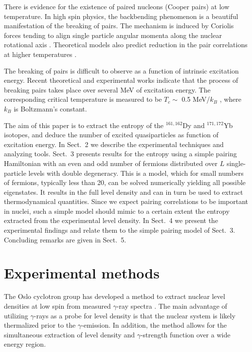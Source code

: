 There is evidence for the existence of paired nucleons (Cooper pairs) at low temperature. In high spin physics, the backbending phenomenon is a beautiful manifestation of the breaking of pairs. The mechanism is induced by Coriolis forces tending to align single particle angular momenta along the nuclear rotational axis \cite{3,4}. Theoretical models also predict reduction in the pair correlations at higher temperatures \cite{5,6,7}.

The breaking of pairs is difficult to observe as a function of intrinsic excitation energy. Recent theoretical \cite{7} and experimental \cite{8,9} works indicate that the process of breaking pairs takes place over several MeV of excitation energy. The corresponding critical temperature is measured to be $T_c \sim $ 0.5 MeV/$k_B$ \cite{10}, where $k_B$ is Boltzmann's constant.

The aim of this paper is to extract the entropy of the $^{161,162}$Dy and $^{171,172}$Yb isotopes, and deduce the number of excited quasiparticles as function of excitation energy. In Sect.~2 we describe the experimental techniques and analyzing tools. Sect.~3 presents results for the entropy using a simple pairing Hamiltonian with an even and odd number of fermions distributed over $L$ single-particle levels with double degeneracy. This is a model, which for small numbers of fermions, typically less than 20, can be solved numerically yielding all possible eigenstates. It results in the full level density and can in turn be used to extract thermodynamical quantities. Since we expect pairing correlations to be important in nuclei, such a simple model should mimic to a certain extent the entropy extracted from the experimental level density. In Sect.~4 we present the experimental findings and relate them to the simple pairing model of Sect.~3. Concluding remarks are given in Sect.~5.


\section{Experimental methods}

The Oslo cyclotron group has developed a method to extract nuclear level densities at low spin from measured $\gamma$-ray spectra \cite{8,9,10,11,17}. The main advantage of utilizing $\gamma$-rays as a probe for level density is that the nuclear system is likely thermalized prior to the $\gamma$-emission. In addition, the method allows for the simultaneous extraction of level density and $\gamma$-strength function over a wide energy region.

